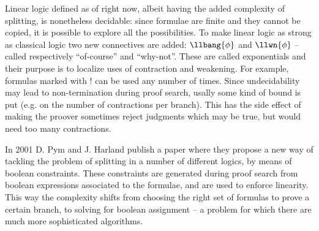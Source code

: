 Linear logic defined as of right now, albeit having the added complexity of splitting, is nonetheless decidable: since formulae are finite and they cannot be copied, it is possible to explore all the possibilities.
To make linear logic as strong as classical logic two new connectives are added: $\llbang{\phi}$ and $\llwn{\phi}$ -- called respectively ``of-course'' and ``why-not''.
These are called exponentials and their purpose is to localize uses of contraction and weakening.
For example, formulas marked with $!$ can be used any number of times. %
Since undecidability may lead to non-termination during proof search, usally some kind of bound is put (e.g. on the number of contractions per branch).
This has the side effect of making the proover sometimes reject judgments which may be true, but would need too many contractions.




In 2001 D. Pym and J. Harland publish a paper \cite{HarlandPym} where they propose a new way of tackling the problem of splitting in a number of different logics, by means of boolean constraints.
These constraints are generated during proof search from boolean expressions associated to the formulae, and are used to enforce linearity.
This way the complexity shifts from choosing the right set of formulas to prove a certain branch, to solving for boolean assignment -- a problem for which there are much more sophisticated algorithms.

